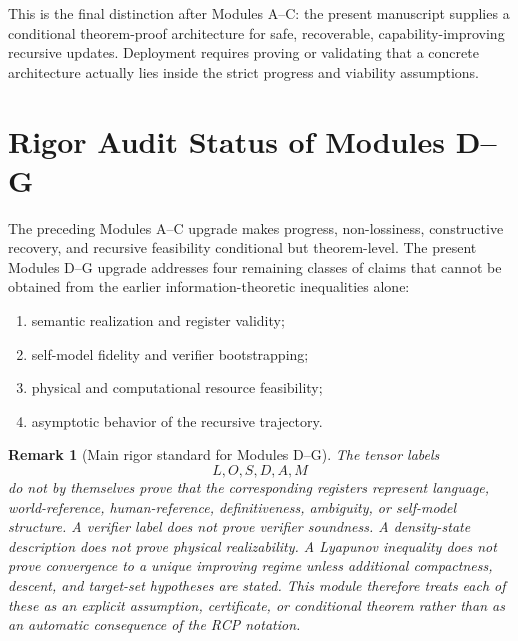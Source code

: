 \documentclass[11pt]{article}
\newtheorem{remark}[theorem]{Remark}
\newcommand{\1}{\mathbf{1}}
\begin{document}
This is the final distinction after Modules A--C: the present manuscript supplies a conditional theorem-proof architecture for safe, recoverable, capability-improving recursive updates.  Deployment requires proving or validating that a concrete architecture actually lies inside the strict progress and viability assumptions.

\section{Rigor Audit Status of Modules D--G}
\label{sec:modules_D_G_audit_status}

The preceding Modules A--C upgrade makes progress, non-lossiness, constructive recovery, and recursive feasibility conditional but theorem-level.  The present Modules D--G upgrade addresses four remaining classes of claims that cannot be obtained from the earlier information-theoretic inequalities alone:
\begin{enumerate}[label=(\Alph*)]
    \item semantic realization and register validity;
    \item self-model fidelity and verifier bootstrapping;
    \item physical and computational resource feasibility;
    \item asymptotic behavior of the recursive trajectory.
\end{enumerate}

\begin{remark}[Main rigor standard for Modules D--G]
The tensor labels
\[
L,O,S,D,A,M
\]
do not by themselves prove that the corresponding registers represent language, world-reference, human-reference, definitiveness, ambiguity, or self-model structure.  A verifier label does not prove verifier soundness.  A density-state description does not prove physical realizability.  A Lyapunov inequality does not prove convergence to a unique improving regime unless additional compactness, descent, and target-set hypotheses are stated.  This module therefore treats each of these as an explicit assumption, certificate, or conditional theorem rather than as an automatic consequence of the RCP notation.
\end{remark}
\end{document}
